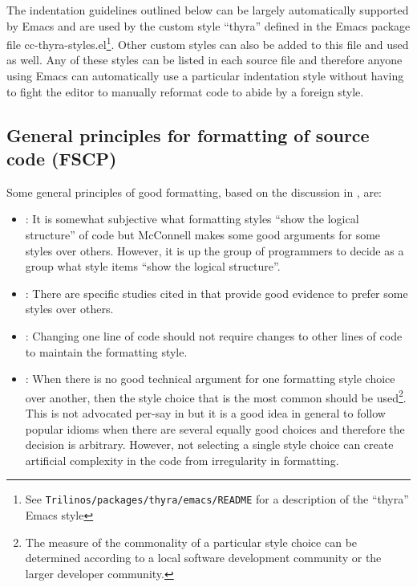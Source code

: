 The indentation guidelines outlined below can be largely automatically
supported by Emacs and are used by the custom style ``thyra'' defined in the
Emacs package file cc-thyra-styles.el\footnote{See
{}\texttt{Trilinos/packages/thyra/emacs/README} for a description of the
``thyra'' Emacs style}.  Other custom styles can also be added to this file
and used as well.  Any of these styles can be listed in each source file and
therefore anyone using Emacs can automatically use a particular indentation
style without having to fight the editor to manually reformat code to abide by
a foreign style.

%
\subsection{General principles for formatting of source code (FSCP)}
%

Some general principles of good formatting, based on the discussion in
{}\cite[Section 31.1]{CodeComplete2nd04}, are:

\begin{itemize}

{}\item\FSCPShowLogicalStructure: It is somewhat subjective what formatting styles
``show the logical structure'' of code but McConnell makes some good arguments
for some styles over others.  However, it is up the group of programmers to
decide as a group what style items ``show the logical structure''.

{}\item\FSCPImproveReadability: There are specific studies cited in
{}\cite[Chapter 31]{CodeComplete2nd04} that provide good evidence to prefer
some styles over others.

{}\item\FSCPRetainFormatting: Changing one line of code should not require changes to
other lines of code to maintain the formatting style.

{}\item\FSCPFollowCommonIdioms: When there is no good technical argument for
one formatting style choice over another, then the style choice that is the
most common should be used\footnote{The measure of the commonality of a
particular style choice can be determined according to a local software
development community or the larger developer community.}.  This is not
advocated per-say in {}\cite[Chapter 31]{CodeComplete2nd04} but it is a good
idea in general to follow popular idioms when there are several equally good
choices and therefore the decision is arbitrary.  However, not selecting a
single style choice can create artificial complexity in the code from
irregularity in formatting.

\end{itemize}

